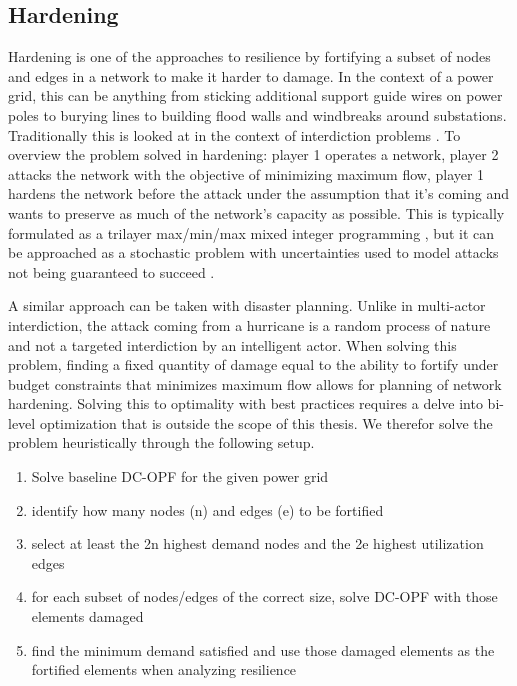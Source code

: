 \documentclass{article}
\begin{document}
	\subsection{Hardening}
	
	Hardening is one of the approaches to resilience by fortifying a subset of nodes and edges in a network to make it harder to damage. In the context of a power grid, this can be anything from sticking additional support guide wires on power poles to burying lines to building flood walls and windbreaks around substations. Traditionally this is looked at in the context of interdiction problems \cite{ChurchEA2007}. To overview the problem solved in hardening: player 1 operates a network, player 2 attacks the network with the objective of minimizing maximum flow, player 1 hardens the network before the attack under the assumption that it's coming and wants to preserve as much of the network's capacity as possible. This is typically formulated as a trilayer max/min/max mixed integer programming \cite{Mahmoo2016}, but it can be approached as a stochastic problem with uncertainties used to model attacks not being guaranteed to succeed \cite{Ramirez2009}.
	
	A similar approach can be taken with disaster planning. Unlike in multi-actor interdiction, the attack coming from a hurricane is a random process of nature and not a targeted interdiction by an intelligent actor. When solving this problem, finding a fixed quantity of damage equal to the ability to fortify under budget constraints that minimizes maximum flow allows for planning of network hardening. Solving this to optimality with best practices requires a delve into bi-level optimization that is outside the scope of this thesis. We therefor solve the problem heuristically through the following setup.
	
	\begin{enumerate}
		
	\item Solve baseline DC-OPF for the given power grid
	\item identify how many nodes (n) and edges (e) to be fortified
	\item select at least the 2n highest demand nodes and the 2e highest utilization edges
	\item for each subset of nodes/edges of the correct size, solve DC-OPF with those elements damaged
	\item find the minimum demand satisfied and use those damaged elements as the fortified elements when analyzing resilience 
	\end{enumerate}
\end{document}
